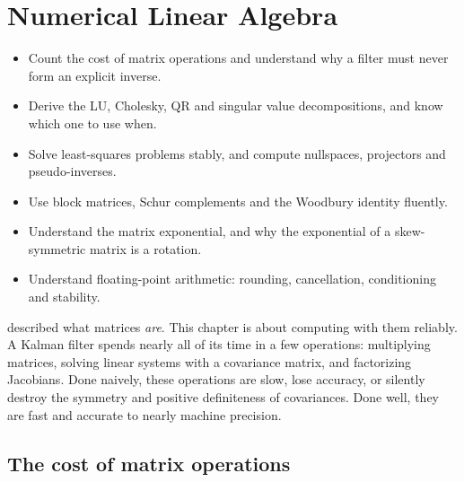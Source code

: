 \chapter{Numerical Linear Algebra}
\label{ch:numlinalg}

\begin{objectives}
\begin{itemize}
  \item Count the cost of matrix operations and understand why a filter must never form an explicit inverse.
  \item Derive the LU, Cholesky, QR and singular value decompositions, and know which one to use when.
  \item Solve least-squares problems stably, and compute nullspaces, projectors and pseudo-inverses.
  \item Use block matrices, Schur complements and the Woodbury identity fluently.
  \item Understand the matrix exponential, and why the exponential of a skew-symmetric matrix is a rotation.
  \item Understand floating-point arithmetic: rounding, cancellation, conditioning and stability.
\end{itemize}
\end{objectives}

 described what matrices \emph{are}. This chapter is about computing with them reliably. A Kalman filter
spends nearly all of its time in a few operations: multiplying matrices, solving linear systems with a covariance matrix,
and factorizing Jacobians. Done naively, these operations are slow, lose accuracy, or silently destroy the symmetry and
positive definiteness of covariances. Done well, they are fast and accurate to nearly machine precision.

\section{The cost of matrix operations}

